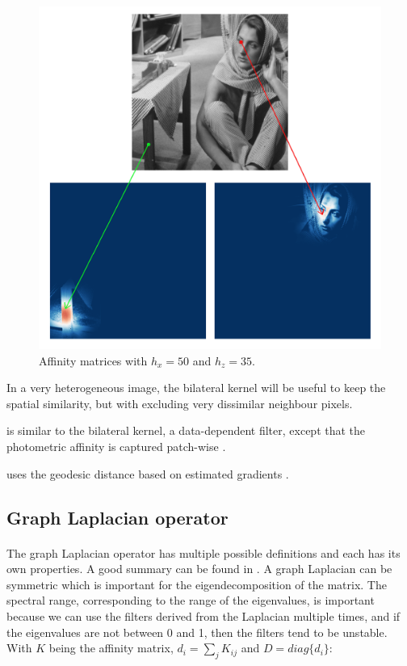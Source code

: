 \begin{description}[align=left]
  \begin{figure}[H]
      \centering
      \includegraphics[width=\textwidth]{img/bilateralAffinityPhoto35Spatial50.png}
      \caption{Affinity matrices with \(h_x = 50\) and \(h_z = 35\).}
  \end{figure}
  In a very heterogeneous image, the bilateral kernel will be useful to keep the spatial similarity, but with excluding very dissimilar neighbour pixels.

 \item [Non-Local Means (NLM)] is similar to the bilateral kernel, a data-dependent filter, except that the photometric affinity is captured patch-wise \cite{glide_2014} \cite{kervrann_nlm_2006}.
 \item [Locally Adaptive Regression Kernel (LARK)] uses the geodesic distance based on estimated gradients \cite{milanfar_symmetrizing_2013} \cite{takeda_kernel_2007}.
\end{description}

\subsection{Graph Laplacian operator}

\paragraph{}
The graph Laplacian operator has multiple possible definitions and each has its own properties.
A good summary can be found in \cite{siam_slides_2016}.
A graph Laplacian can be symmetric which is important for the eigendecomposition of the matrix.
The spectral range, corresponding to the range of the eigenvalues, is important because we can use the filters derived from the Laplacian multiple times, and if the eigenvalues are not between 0 and 1, then the filters tend to be unstable.
With \(K\) being the affinity matrix, \(d_i = \sum_j K_{ij}\) and \(D = diag\{d_i\}\):

